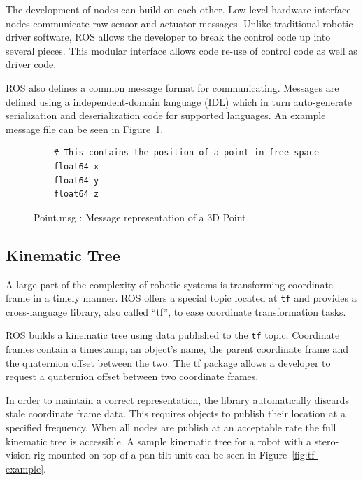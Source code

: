 The development of nodes can build on each other. Low-level hardware interface nodes communicate raw sensor and actuator messages. Unlike traditional robotic driver software, ROS allows the developer to break the control code up into several pieces. This modular interface allows code re-use of control code as well as driver code.

ROS also defines a common message format for communicating. Messages are defined using a independent-domain language (IDL) which in turn auto-generate serialization and deserialization code for supported languages. An example message file can be seen in Figure~\ref{fig:point}.

\begin{figure}[ht]
\makebox[\textwidth]{\hrulefill}
\begin{verbatim}
	# This contains the position of a point in free space
	float64 x
	float64 y
	float64 z
\end{verbatim}
\makebox[\textwidth]{\hrulefill}
\caption{Point.msg : Message representation of a 3D Point\label{fig:point}}
\end{figure}

\subsection{Kinematic Tree}
A large part of the complexity of robotic systems is transforming coordinate frame in a timely manner. ROS offers a special topic located at \verb!tf! and provides a cross-language library, also called ``tf'', to ease coordinate transformation tasks.

ROS builds a kinematic tree using data published to the \verb!tf! topic. Coordinate frames contain a timestamp, an object's name, the parent coordinate frame and the quaternion offset between the two. The tf package allows a developer to request a quaternion offset between two coordinate frames. 

In order to maintain a correct representation, the library automatically discards stale coordinate frame data. This requires objects to publish their location at a specified frequency. When all nodes are publish at an acceptable rate the full kinematic tree is accessible. A sample kinematic tree for a robot with a stero-vision rig mounted on-top of a pan-tilt unit can be seen in Figure~\ref{fig:tf-example}.

